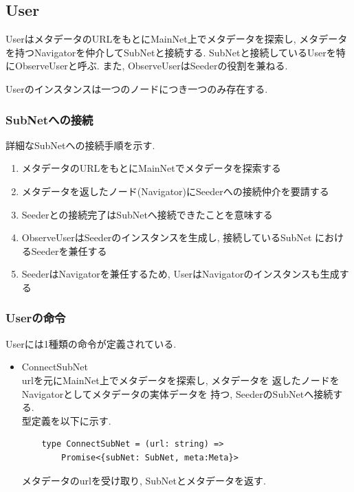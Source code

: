\documentclass[sotsuron]{jcsie}
\begin{document}
\subsection{User}
UserはメタデータのURLをもとにMainNet上でメタデータを探索し, 
メタデータを持つNavigatorを仲介してSubNetと接続する.
SubNetと接続しているUserを特にObserveUserと呼ぶ.
また, ObserveUserはSeederの役割を兼ねる.

Userのインスタンスは一つのノードにつき一つのみ存在する.

\subsubsection{SubNetへの接続}
詳細なSubNetへの接続手順を示す.
\begin{enumerate}
	\item メタデータのURLをもとにMainNetでメタデータを探索する
	\item メタデータを返したノード(Navigator)にSeederへの接続仲介を要請する
	\item Seederとの接続完了はSubNetへ接続できたことを意味する
	\item 
	      ObserveUserはSeederのインスタンスを生成し, 接続しているSubNet
	      におけるSeederを兼任する
	\item SeederはNavigatorを兼任するため, 
		  UserはNavigatorのインスタンスも生成する
\end{enumerate}

\subsubsection{Userの命令}
Userには1種類の命令が定義されている.
\begin{itemize}
	\item {ConnectSubNet}\\
	      urlを元にMainNet上でメタデータを探索し, メタデータを
	      返したノードをNavigatorとしてメタデータの実体データを
	      持つ, SeederのSubNetへ接続する.\\
	      	      	      	      
	      型定義を以下に示す.
	      \begin{lstlisting}
	type ConnectSubNet = (url: string) =>
		Promise<{subNet: SubNet, meta:Meta}>
	      \end{lstlisting}
	      	      	      	      
	      メタデータのurlを受け取り, 
	      SubNetとメタデータを返す.
\end{itemize}
\end{document}
